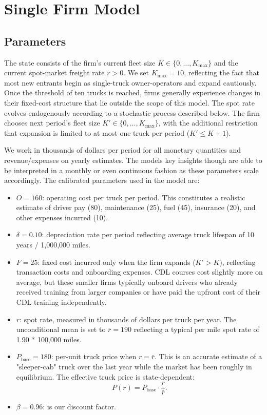 \documentclass[12pt]{article}
\begin{document}
	\section{Single Firm Model}
	
	\subsection{Parameters}
	
	\indent The state consists of the firm's current fleet size $K\in\{0,\dots,K_{\max}\}$ and the current spot-market freight rate $r>0$. We set $K_{\max}=10$, reflecting the fact that most new entrants begin as single-truck owner-operators and expand cautiously. Once the threshold of ten trucks is reached, firms generally experience changes in their fixed-cost structure that lie outside the scope of this model. The spot rate evolves endogenously according to a stochastic process described below. The firm chooses next period’s fleet size $K'\in\{0,\dots,K_{\max}\}$, with the additional restriction that expansion is limited to at most one truck per period ($K' \le K+1$).
	
	\indent We work in thousands of dollars per period for all monetary quantities and revenue/expenses on yearly estimates. The models key insights though are able to be interpreted in a monthly or even continuous fashion as these parameters scale accordingly. The calibrated parameters used in the model are:
	
	\begin{itemize}
		\item $O = 160$: operating cost per truck per period.  This constitutes a realistic estimate of driver pay (80), maintenance (25), fuel (45), insurance (20), and other expenses incurred (10).
		\item $\delta = 0.10$: depreciation rate per period reflecting average truck lifespan of 10 years / 1,000,000 miles.
		\item $F = 25$: fixed cost incurred only when the firm expands ($K'>K$), reflecting transaction costs and onboarding expenses.  CDL courses cost slightly more on average, but these smaller firms typically onboard drivers who already received training from larger companies or have paid the upfront cost of their CDL training independently.
		\item $r$: spot rate, measured in thousands of dollars per truck per year. The unconditional mean is set to $\bar r = 190$ reflecting a typical per mile spot rate of 1.90 * 100,000 miles.
		\item $P_{\text{base}} = 180$: per-unit truck price when $r=\bar r$.  This is an accurate estimate of a "sleeper-cab" truck over the last year while the market has been roughly in equilibrium. The effective truck price is state-dependent:
		\[
		P(r) = P_{\text{base}} \cdot \frac{r}{\bar r}.
		\]
		\item $\beta = 0.96$: is our discount factor.
	\end{itemize}
	
\end{document}
